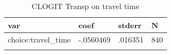 \documentclass{article}
\begin{document}
\begin{table}[tbp] \centering
{}

\caption{CLOGIT Transp on travel time}
\begin{tabularx}{\textwidth}{lCCC}

\toprule
{var}&{coef}&{stderr}&{N} \tabularnewline
\midrule\addlinespace[1.5ex]
choice:travel\_time&-.0560469&.016351&840 \tabularnewline
\bottomrule \addlinespace[1.5ex]

\end{tabularx}
\end{table}
\end{document}
